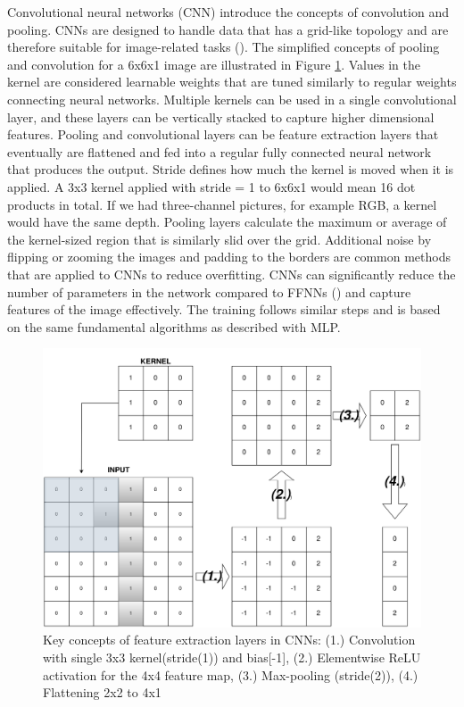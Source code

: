 Convolutional neural networks (CNN) introduce the concepts of convolution and pooling. CNNs are designed to handle data that has a grid-like topology and are therefore suitable for image-related tasks (\cite{Goodfellow-et-al-2016}). The simplified concepts of pooling and convolution for a 6x6x1 image are illustrated in Figure \ref{CnnExpl}. Values in the kernel are considered learnable weights that are tuned similarly to regular weights connecting neural networks. Multiple kernels can be used in a single convolutional layer, and these layers can be vertically stacked to capture higher dimensional features. Pooling and convolutional layers can be feature extraction layers that eventually are flattened and fed into a regular fully connected neural network that produces the output. Stride defines how much the kernel is moved when it is applied. A 3x3 kernel applied with stride = 1 to 6x6x1 would mean 16 dot products in total. If we had three-channel pictures, for example RGB, a kernel would have the same depth. Pooling layers calculate the maximum or average of the kernel-sized region that is similarly slid over the grid. Additional noise by flipping or zooming the images and padding to the borders are common methods that are applied to CNNs to reduce overfitting. CNNs can significantly reduce the number of parameters in the network compared to FFNNs (\cite{oshea2015introduction}) and capture features of the image effectively. The training follows similar steps and is based on the same fundamental algorithms as described with MLP.

\begin{figure}
    \centering
    \includegraphics[width=0.75\linewidth]{CNN2EXPL.png}
    \caption{Key concepts of feature extraction layers in CNNs: (1.) Convolution with single 3x3 kernel(stride(1)) and bias[-1], (2.) Elementwise ReLU activation for the 4x4 feature map, (3.) Max-pooling (stride(2)), (4.) Flattening 2x2 to 4x1}
    \label{CnnExpl}
\end{figure}


